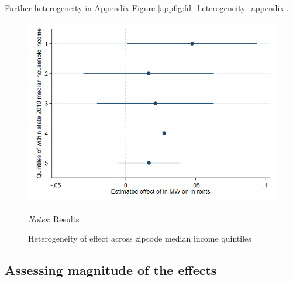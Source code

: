     Further heterogeneity in Appendix Figure \ref{appfig:fd_heterogeneity_appendix}.
    
    \begin{figure}[h!] \centering
        \caption{Heterogeneity of effect across zipcode median income quintiles}
        \label{fig:fd_heterogeneity_income}
        \includegraphics[width=0.75\linewidth]{analysis/first_differences/output/fd_static_heter_med_hhinc20105.png}
        \begin{minipage}{.95\textwidth} \footnotesize
			\vspace{2mm} 
			\textit{Notes}: Results 
		\end{minipage}
    \end{figure}
    
\subsection{Assessing magnitude of the effects}\label{subsec:results/magnitude}


